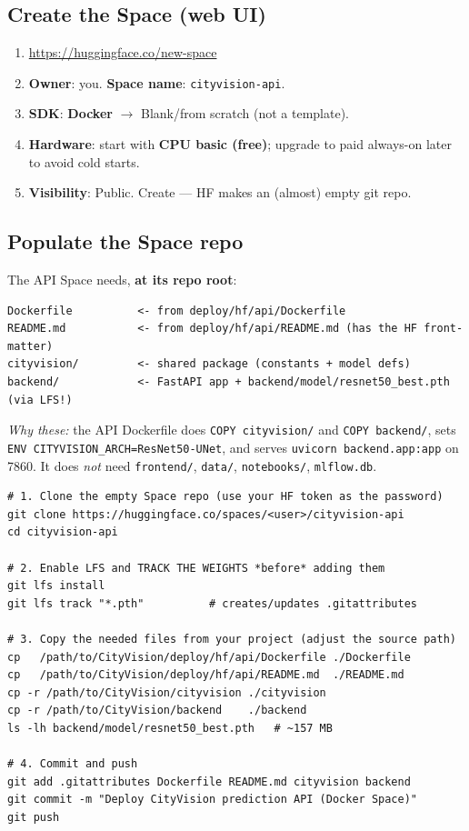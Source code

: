 \documentclass[11pt]{article}
\newcommand{\code}[1]{\lstinline[basicstyle=\ttfamily\normalsize]|#1|}
\newcommand{\rarr}{$\rightarrow$}
\begin{document}
\subsection{Create the Space (web UI)}
\begin{enumerate}
  \item \url{https://huggingface.co/new-space}
  \item \textbf{Owner}: you. \textbf{Space name}: \code{cityvision-api}.
  \item \textbf{SDK}: \textbf{Docker} \rarr{} Blank/from scratch (not a template).
  \item \textbf{Hardware}: start with \textbf{CPU basic (free)}; upgrade to paid
    always-on later to avoid cold starts.
  \item \textbf{Visibility}: Public. Create --- HF makes an (almost) empty git repo.
\end{enumerate}

\subsection{Populate the Space repo}
The API Space needs, \textbf{at its repo root}:
\begin{lstlisting}[style=block]
Dockerfile          <- from deploy/hf/api/Dockerfile
README.md           <- from deploy/hf/api/README.md (has the HF front-matter)
cityvision/         <- shared package (constants + model defs)
backend/            <- FastAPI app + backend/model/resnet50_best.pth (via LFS!)
\end{lstlisting}
\emph{Why these:} the API Dockerfile does \code{COPY cityvision/} and
\code{COPY backend/}, sets \code{ENV CITYVISION_ARCH=ResNet50-UNet}, and serves
\code{uvicorn backend.app:app} on 7860. It does \emph{not} need \code{frontend/},
\code{data/}, \code{notebooks/}, \code{mlflow.db}.

\begin{lstlisting}[style=block]
# 1. Clone the empty Space repo (use your HF token as the password)
git clone https://huggingface.co/spaces/<user>/cityvision-api
cd cityvision-api

# 2. Enable LFS and TRACK THE WEIGHTS *before* adding them
git lfs install
git lfs track "*.pth"          # creates/updates .gitattributes

# 3. Copy the needed files from your project (adjust the source path)
cp   /path/to/CityVision/deploy/hf/api/Dockerfile ./Dockerfile
cp   /path/to/CityVision/deploy/hf/api/README.md  ./README.md
cp -r /path/to/CityVision/cityvision ./cityvision
cp -r /path/to/CityVision/backend    ./backend
ls -lh backend/model/resnet50_best.pth   # ~157 MB

# 4. Commit and push
git add .gitattributes Dockerfile README.md cityvision backend
git commit -m "Deploy CityVision prediction API (Docker Space)"
git push
\end{lstlisting}
\end{document}
